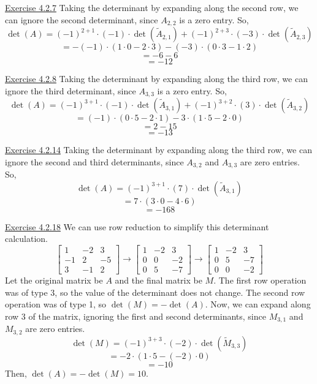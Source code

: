 \documentclass{exam}
\begin{document}
\underline{Exercise 4.2.7}
\newline
\newline
Taking the determinant by expanding along the second row, we can ignore the second determinant, since $A_{2,2}$ is a zero entry. So,
\[\det(A)=(-1)^{2+1}\cdot(-1)\cdot\det(\tilde{A}_{2,1})+(-1)^{2+3}\cdot(-3)\cdot\det(\tilde{A}_{2,3})\]
\[=-(-1)\cdot(1\cdot0-2\cdot3)-(-3)\cdot(0\cdot3-1\cdot2)\]
\[=-6-6\]
\[=-12\]
\newline

\underline{Exercise 4.2.8}
\newline
\newline
Taking the determinant by expanding along the third row, we can ignore the third determinant, since $A_{3,3}$ is a zero entry. So,
\[\det(A)=(-1)^{3+1}\cdot(-1)\cdot\det(\tilde{A}_{3,1})+(-1)^{3+2}\cdot(3)\cdot\det(\tilde{A}_{3,2})\]
\[=(-1)\cdot(0\cdot5-2\cdot1)-3\cdot(1\cdot5-2\cdot0)\]
\[=2-15\]
\[=-13\]
\newline

\underline{Exercise 4.2.14}
\newline
\newline
Taking the determinant by expanding along the third row, we can ignore the second and third determinants, since $A_{3,2}$ and $A_{3,3}$ are zero entries. So,
\[\det(A)=(-1)^{3+1}\cdot(7)\cdot\det(\tilde{A}_{3,1})\]
\[=7\cdot(3\cdot0-4\cdot6)\]
\[=-168\]
\newline

\underline{Exercise 4.2.18}
\newline
\newline
We can use row reduction to simplify this determinant calculation.
\[
\begin{bmatrix}
    1 & -2 & 3 \\
    -1 & 2 & -5 \\
    3 & -1 & 2
\end{bmatrix}
\to
\begin{bmatrix}
    1 & -2 & 3 \\
    0 & 0 & -2 \\
    0 & 5 & -7
\end{bmatrix}
\to
\begin{bmatrix}
    1 & -2 & 3 \\
    0 & 5 & -7 \\
    0 & 0 & -2
\end{bmatrix}
\]
Let the original matrix be $A$ and the final matrix be $M$. The first row operation was of type 3, so the value of the determinant does not change. The second row operation was of type 1, so $\det(M)=-\det(A)$. Now, we can expand along row 3 of the matrix, ignoring the first and second determinants, since $M_{3,1}$ and $M_{3,2}$ are zero entries.
\[\det(M)=(-1)^{3+3}\cdot(-2)\cdot\det(\tilde{M}_{3,3})\]
\[=-2\cdot(1\cdot5-(-2)\cdot0)\]
\[=-10\]
Then, $\det(A)=-\det(M)=10$.
\newline
\end{document}

